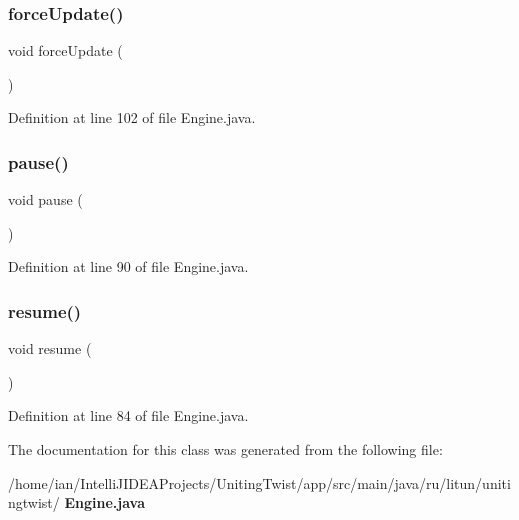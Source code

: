 \subsubsection{force\+Update()}
{\footnotesize\ttfamily void force\+Update (\begin{DoxyParamCaption}{ }\end{DoxyParamCaption})}



Definition at line 102 of file Engine.\+java.

\mbox{\label{classsf_1_1unitingtwist_1_1_engine_a7167f5c196fc5e167bfabde1a730e81d}} 
\subsubsection{pause()}
{\footnotesize\ttfamily void pause (\begin{DoxyParamCaption}{ }\end{DoxyParamCaption})}



Definition at line 90 of file Engine.\+java.

\mbox{\label{classsf_1_1unitingtwist_1_1_engine_a41de8150eff044a237990c271d57ea27}} 
\subsubsection{resume()}
{\footnotesize\ttfamily void resume (\begin{DoxyParamCaption}{ }\end{DoxyParamCaption})}



Definition at line 84 of file Engine.\+java.



The documentation for this class was generated from the following file\+:\begin{DoxyCompactItemize}
\item 
/home/ian/\+Intelli\+J\+I\+D\+E\+A\+Projects/\+Uniting\+Twist/app/src/main/java/ru/litun/unitingtwist/\textbf{ Engine.\+java}\end{DoxyCompactItemize}
